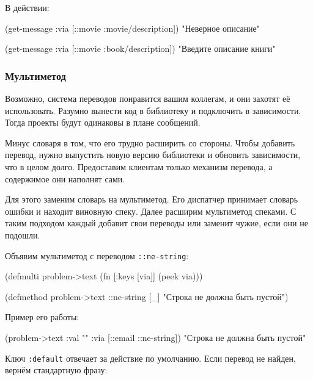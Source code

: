 \noindent
В действии:

  \begin{clojure}
(get-message {:via [::movie :movie/description]})
"Неверное описание"

(get-message {:via [::movie :book/description]})
"Введите описание книги"
  \end{clojure}

\subsubsection{Мультиметод}

Возможно, система переводов понравится вашим коллегам, и они захотят её
использовать. Разумно вынести код в библиотеку и подключить в зависимости. Тогда
проекты будут одинаковы в плане сообщений.

Минус словаря в том, что его трудно расширить со стороны. Чтобы добавить
перевод, нужно выпустить новую версию библиотеки и обновить зависимости, что в
целом долго. Предоставим клиентам только механизм перевода, а содержимое они
наполнят сами.

Для этого заменим словарь на мультиметод. Его диспатчер принимает словарь ошибки
и находит виновную спеку. Далее расширим мультиметод спеками. С таким подходом
каждый добавит свои переводы или заменит чужие, если они не подошли.

Объявим мультиметод с переводом \verb|::ne-string|:


  \begin{clojure}
(defmulti problem->text
  (fn [{:keys [via]}]
    (peek via)))

(defmethod problem->text ::ne-string [_]
  "Строка не должна быть пустой")
  \end{clojure}

\noindent
Пример его работы:

  \begin{clojure}
(problem->text {:val "" :via [::email ::ne-string]})
"Строка не должна быть пустой"
  \end{clojure}

Ключ \verb|:default| отвечает за действие по умолчанию. Если перевод не
найден, вернём стандартную фразу:

